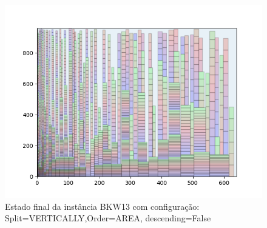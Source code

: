 \begin{figure}[H]
    \centering
    \caption[]{Estado final da instância BKW13 com configuração: Split=VERTICALLY,Order=AREA, descending=False}
    \label{fig:bkw13-vertically-area-false}
    \includegraphics[scale=0.5]{output/figures/bkw/bkw13/vertically/area/false/0000}
\end{figure}